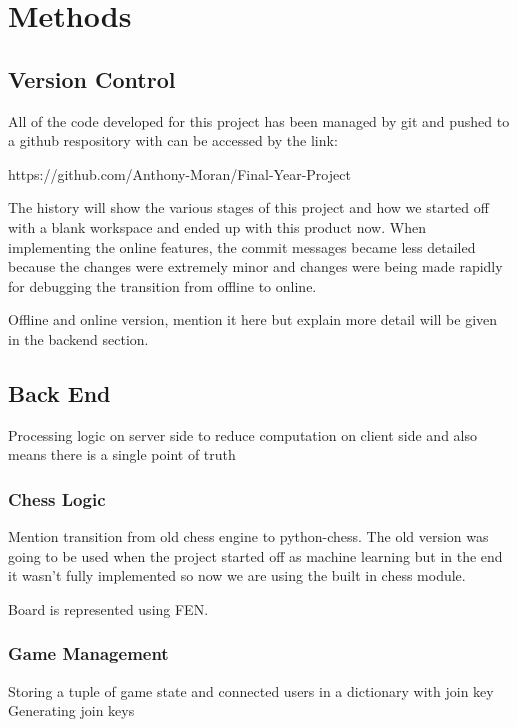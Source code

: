\chapter{Methods}
\label{chapter2}

\section{Version Control}
All of the code developed for this project has been managed by git and pushed to a github respository with can be accessed by the link:

\begin{center}
    https://github.com/Anthony-Moran/Final-Year-Project
\end{center}

The history will show the various stages of this project and how we started off with a blank workspace and ended up with this product now.
When implementing the online features, the commit messages became less detailed because the changes were extremely minor and changes were being made rapidly for debugging the transition from offline to online.

Offline and online version, mention it here but explain more detail will be given in the backend section.

\section{Back End}

Processing logic on server side to reduce computation on client side and also means there is a single point of truth

\subsection{Chess Logic}

Mention transition from old chess engine to python-chess. The old version was going to be used when the project started off as machine learning but in the end it wasn't fully implemented so now we are using the built in chess module.

Board is represented using FEN.

\subsection{Game Management}

Storing a tuple of game state and connected users in a dictionary with join key\linebreak
Generating join keys

